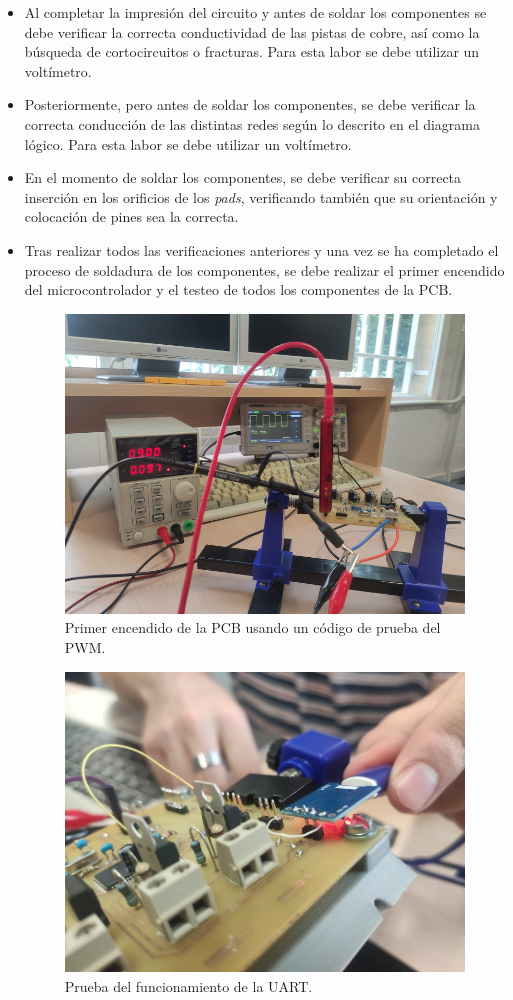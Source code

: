 \begin{itemize}
    \item Al completar la impresión del circuito y antes de soldar los componentes se debe verificar la correcta conductividad de las pistas de cobre, así como la búsqueda de cortocircuitos o fracturas. Para esta labor se debe utilizar un voltímetro.
    
    \item Posteriormente, pero antes de soldar los componentes, se debe verificar la correcta conducción de las distintas redes según lo descrito en el diagrama lógico. Para esta labor se debe utilizar un voltímetro.
    
    \item En el momento de soldar los componentes, se debe verificar su correcta inserción en los orificios de los \textit{pads}, verificando también que su orientación y colocación de pines sea la correcta.
    
    \item Tras realizar todos las verificaciones anteriores y una vez se ha completado el proceso de soldadura de los componentes, se debe realizar el primer encendido del microcontrolador y el testeo de todos los componentes de la \ac{PCB}.
        
    \begin{figure}[H]
    \centering 
    \includegraphics[width=0.55\linewidth]{pictures/PrimerEncendido.jpg}
    \caption{Primer encendido de la \ac{PCB} usando un código de prueba del PWM.}
    \end{figure}
    
    \begin{figure}[H]
    \centering 
    \includegraphics[width=0.55\linewidth]{pictures/PruebaUart}
    \caption{Prueba del funcionamiento de la UART.}
    \end{figure}
    

\end{itemize}
